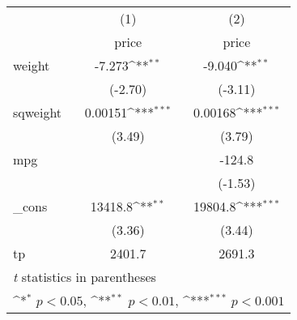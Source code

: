 {
\def\sym#1{\ifmmode^{#1}\else\(^{#1}\)\fi}
\begin{tabular}{l*{2}{c}}
\hline\hline
            &\multicolumn{1}{c}{(1)}&\multicolumn{1}{c}{(2)}\\
            &\multicolumn{1}{c}{price}&\multicolumn{1}{c}{price}\\
\hline
weight      &      -7.273\sym{**} &      -9.040\sym{**} \\
            &     (-2.70)         &     (-3.11)         \\
[1em]
sqweight    &     0.00151\sym{***}&     0.00168\sym{***}\\
            &      (3.49)         &      (3.79)         \\
[1em]
mpg         &                     &      -124.8         \\
            &                     &     (-1.53)         \\
[1em]
\_cons      &     13418.8\sym{**} &     19804.8\sym{***}\\
            &      (3.36)         &      (3.44)         \\
\hline
tp          &      2401.7         &      2691.3         \\
\hline\hline
\multicolumn{3}{l}{\footnotesize \textit{t} statistics in parentheses}\\
\multicolumn{3}{l}{\footnotesize \sym{*} \(p<0.05\), \sym{**} \(p<0.01\), \sym{***} \(p<0.001\)}\\
\end{tabular}
}
